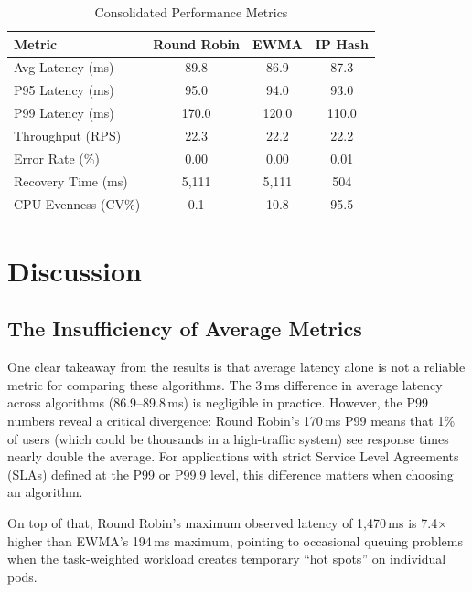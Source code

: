 \documentclass[conference]{IEEEtran}
\begin{document}
\begin{table}[H]
\centering
\caption{Consolidated Performance Metrics}
\label{tab:master}
\begin{tabular}{l c c c}
\toprule
\textbf{Metric} & \textbf{Round Robin} & \textbf{EWMA} & \textbf{IP Hash} \\
\midrule
Avg Latency (ms) & 89.8 & 86.9 & 87.3 \\
P95 Latency (ms) & 95.0 & 94.0 & 93.0 \\
P99 Latency (ms) & 170.0 & 120.0 & 110.0 \\
Throughput (RPS) & 22.3 & 22.2 & 22.2 \\
Error Rate (\%) & 0.00 & 0.00 & 0.01 \\
Recovery Time (ms) & 5,111 & 5,111 & 504 \\
CPU Evenness (CV\%) & 0.1 & 10.8 & 95.5 \\
\bottomrule
\end{tabular}
\end{table}


\section{Discussion}

\subsection{The Insufficiency of Average Metrics}

One clear takeaway from the results is that average latency alone is not a reliable metric for comparing these algorithms. The 3\,ms difference in average latency across algorithms (86.9--89.8\,ms) is negligible in practice. However, the P99 numbers reveal a critical divergence: Round Robin's 170\,ms P99 means that 1\% of users (which could be thousands in a high-traffic system) see response times nearly double the average. For applications with strict Service Level Agreements (SLAs) defined at the P99 or P99.9 level, this difference matters when choosing an algorithm.

On top of that, Round Robin's maximum observed latency of 1,470\,ms is 7.4$\times$ higher than EWMA's 194\,ms maximum, pointing to occasional queuing problems when the task-weighted workload creates temporary ``hot spots'' on individual pods.
\end{document}
